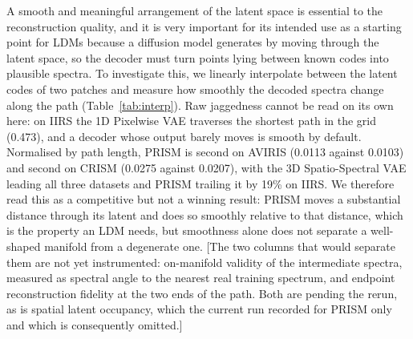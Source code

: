 \documentclass[twoside,11pt]{article}
\begin{document}
A smooth and meaningful arrangement of the latent space is essential to the reconstruction quality, and it is very important for its intended use as a starting point for LDMs because a diffusion model generates by moving through the latent space, so the decoder must turn points lying between known codes into plausible spectra. To investigate this, we linearly interpolate between the latent codes of two patches and measure how smoothly the decoded spectra change along the path (Table~\ref{tab:interp}). Raw jaggedness cannot be read on its own here: on IIRS the 1D Pixelwise VAE traverses the shortest path in the grid (0.473), and a decoder whose output barely moves is smooth by default. Normalised by path length, PRISM is second on AVIRIS (0.0113 against 0.0103) and second on CRISM (0.0275 against 0.0207), with the 3D Spatio-Spectral VAE leading all three datasets and PRISM trailing it by 19\% on IIRS. We therefore read this as a competitive but not a winning result: PRISM moves a substantial distance through its latent and does so smoothly relative to that distance, which is the property an LDM needs, but smoothness alone does not separate a well-shaped manifold from a degenerate one. [The two columns that would separate them are not yet instrumented: on-manifold validity of the intermediate spectra, measured as spectral angle to the nearest real training spectrum, and endpoint reconstruction fidelity at the two ends of the path. Both are pending the rerun, as is spatial latent occupancy, which the current run recorded for PRISM only and which is consequently omitted.]
\end{document}
